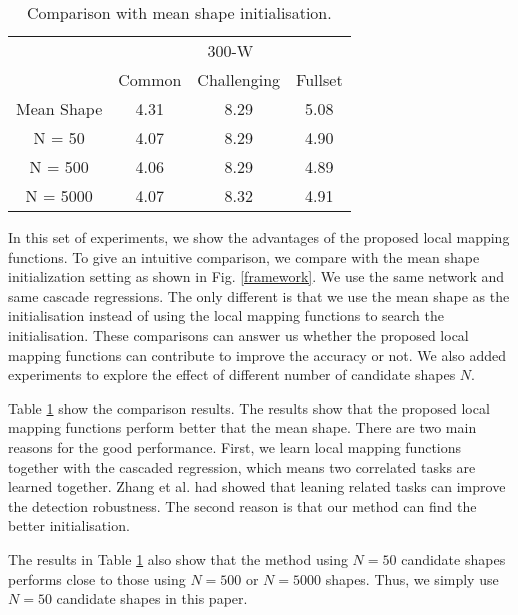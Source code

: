 \documentclass[journal]{IEEEtran}
\begin{document}
\begin{table}[h]
\small
    \centering \caption{Comparison with mean shape initialisation.}
    \begin{tabular}{c|c c c}
      \hline
 & \multicolumn{3}{|c}{300-W}\\
    & Common & Challenging & Fullset \\
        \hline
         Mean Shape  & 4.31 & 8.29 & 5.08  \\
         \hline
        N = 50 & 4.07 & 8.29 & 4.90 \\
        \hline
        N = 500 & 4.06  & 8.29 & 4.89 \\
        \hline
        N = 5000 & 4.07 & 8.32 & 4.91 \\
        \hline
        \end{tabular}
    \label{mean_shape}
\end{table}

In this set of experiments, we show the advantages of the proposed local mapping functions. To give an intuitive comparison, we compare with the mean shape initialization setting as shown in Fig. \ref{framework}. We use the same network and same cascade regressions. The only different is that we use the mean shape as the initialisation instead of using the local mapping functions to search the initialisation. These comparisons can answer us whether the proposed local mapping functions can contribute to improve the accuracy or not. We also added experiments to explore the effect of different number of candidate shapes $N$.

Table \ref{mean_shape} show the comparison results. The results show that the proposed local mapping functions perform better that the mean shape. There are two main reasons for the good performance. First, we learn local mapping functions together with the cascaded regression, which means two correlated tasks are learned together. Zhang et al. \cite{zhang2014facial} had showed that leaning related tasks can improve the detection robustness. The second reason is that our method can find the better initialisation. %

The results in Table \ref{mean_shape} also show that the method using $N=50$ candidate shapes performs close to those using $N=500$ or $N=5000$ shapes. Thus, we simply use $N=50$ candidate shapes in this paper.
\end{document}
